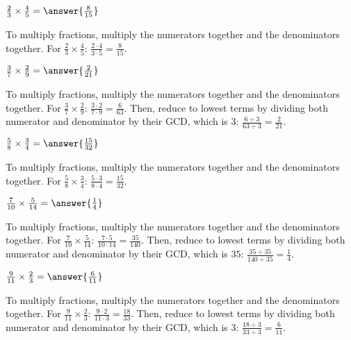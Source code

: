 \documentclass{ximera}
\begin{document}
\begin{problem}
$\frac{2}{3} \times \frac{4}{5} = \answer{\frac{8}{15}}$
\begin{feedback}
To multiply fractions, multiply the numerators together and the denominators together. For $\frac{2}{3} \times \frac{4}{5}$: $\frac{2 \cdot 4}{3 \cdot 5} = \frac{8}{15}$.
\end{feedback}
\end{problem}

\begin{problem}
$\frac{3}{7} \times \frac{2}{9} = \answer{\frac{2}{21}}$
\begin{feedback}
To multiply fractions, multiply the numerators together and the denominators together. For $\frac{3}{7} \times \frac{2}{9}$: $\frac{3 \cdot 2}{7 \cdot 9} = \frac{6}{63}$. Then, reduce to lowest terms by dividing both numerator and denominator by their GCD, which is $3$: $\frac{6 \div 3}{63 \div 3} = \frac{2}{21}$.
\end{feedback}
\end{problem}

\begin{problem}
$\frac{5}{8} \times \frac{3}{4} = \answer{\frac{15}{32}}$
\begin{feedback}
To multiply fractions, multiply the numerators together and the denominators together. For $\frac{5}{8} \times \frac{3}{4}$: $\frac{5 \cdot 3}{8 \cdot 4} = \frac{15}{32}$.
\end{feedback}
\end{problem}

\begin{problem}
$\frac{7}{10} \times \frac{5}{14} = \answer{\frac{1}{4}}$
\begin{feedback}
To multiply fractions, multiply the numerators together and the denominators together. For $\frac{7}{10} \times \frac{5}{14}$: $\frac{7 \cdot 5}{10 \cdot 14} = \frac{35}{140}$. Then, reduce to lowest terms by dividing both numerator and denominator by their GCD, which is $35$: $\frac{35 \div 35}{140 \div 35} = \frac{1}{4}$.
\end{feedback}
\end{problem}

\begin{problem}
$\frac{9}{11} \times \frac{2}{3} = \answer{\frac{6}{11}}$
\begin{feedback}
To multiply fractions, multiply the numerators together and the denominators together. For $\frac{9}{11} \times \frac{2}{3}$: $\frac{9 \cdot 2}{11 \cdot 3} = \frac{18}{33}$. Then, reduce to lowest terms by dividing both numerator and denominator by their GCD, which is $3$: $\frac{18 \div 3}{33 \div 3} = \frac{6}{11}$.
\end{feedback}
\end{problem}
\end{document}

